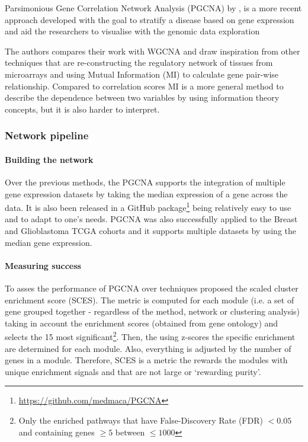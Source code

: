 Parsimonious Gene Correlation Network Analysis (PGCNA) by \citet{Care2019-ij}, is a more recent  approach developed with the goal to stratify a disease based on gene expression and aid the researchers to visualise with the genomic data exploration

The authors compares their work with WGCNA and draw inspiration from other techniques that are re-constructing the regulatory network of tissues from microarrays and using Mutual Information (MI) \citet{Margolin2006-mc,Zhang2013-fs} to calculate gene pair-wise relationship. Compared to correlation scores MI is a more general method to describe the dependence between two variables by using information theory concepts, but it is also harder to interpret.

\subsubsection{Network pipeline}

\paragraph*{Building the network} 

Over the previous methods, the PGCNA supports the integration of multiple gene expression datasets by taking the median expression of a gene across the data. It is also been released in a GitHub package\footnote{\url{https://github.com/medmaca/PGCNA} } being relatively easy to use and to adapt to one's needs. PGCNA was also successfully applied to the Breast and Glioblastoma TCGA cohorts and it supports multiple datasets by using the median gene expression.

\paragraph*{Measuring success} 

To asses the performance of PGCNA over techniques \citet{Care2019-ij} proposed the scaled cluster enrichment score (SCES). The metric is computed for each module (i.e. a set of gene grouped together - regardless of the method, network or clustering analysis) taking in account the enrichment scores (obtained from gene ontology) and selects the 15 most significant\footnote{Only the enriched pathways that have False-Discovery Rate (FDR) $<0.05$ and containing genes $\geq5$ between $\leq1000$}. Then, the using z-scores the specific enrichment are determined for each module. Also, everything is adjusted by the number of genes in a module. Therefore, SCES is a metric the rewards the modules with unique enrichment signals and that are not large or ‘rewarding purity'\cite{Care2019-ij}.

